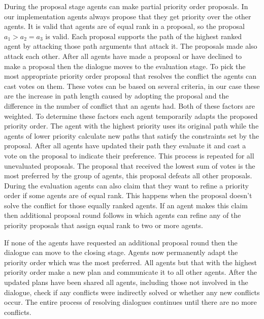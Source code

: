 During the proposal stage agents can make partial priority order proposals. In 
our implementation agents always propose that they get priority over the other 
agents. It is valid that agents are of equal rank in a proposal, so the 
proposal $a_1 > a_2 = a_3$ is valid. Each proposal supports the path of the 
highest ranked agent by attacking those path arguments that attack it. The 
proposals made also attack each other. After all agents have made a proposal or 
have declined to make a proposal then the dialogue moves to the evaluation 
stage. To pick the most appropriate priority order proposal that resolves the 
conflict the agents can cast votes on them. These votes can be based on several 
criteria, in our case these are the increase in path length caused by 
adopting the proposal and the difference in the number of conflict that an 
agents had. Both of these factors are weighted. To determine these factors each 
agent temporarily adapts the proposed priority order. The agent with the 
highest priority uses its original path while the agents of lower priority 
calculate new paths that satisfy the constraints set by the proposal. After all 
agents have updated their path they evaluate it and cast a vote on the 
proposal to indicate their preference. This process is repeated for all 
unevaluated proposals. The proposal that received the lowest sum of votes is 
the most preferred by the group of agents, this proposal defeats all other 
proposals. During the evaluation agents can also claim that they want to refine 
a priority order if some agents are of equal rank. This happens when the 
proposal doesn't solve the conflict for those equally ranked agents. If an 
agent makes this claim then additional proposal round follows in which agents 
can refine any of the priority proposals that assign equal rank to two or more 
agents.

If none of the agents have requested an additional proposal round then the 
dialogue can move to the closing stage. Agents now permanently adapt the 
priority order which was the most preferred. All agents but that with the 
highest priority order make a new plan and communicate it to all other agents. 
After the updated plans have been shared all agents, including those not 
involved in the dialogue, check if any conflicts were indirectly solved or 
whether any new conflicts occur. The entire process of resolving dialogues 
continues until there are no more conflicts.

